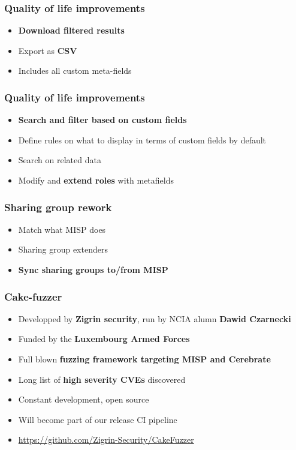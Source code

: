 \begin{frame}
\frametitle{Quality of life improvements}
    \begin{itemize}
        \item {\bf Download filtered results}
        \item Export as {\bf CSV}
        \item Includes all custom meta-fields
    \end{itemize}
\end{frame}

\begin{frame}
\frametitle{Quality of life improvements}
    \begin{itemize}
        \item {\bf Search and filter based on custom fields}
        \item Define rules on what to display in terms of custom fields by default
        \item Search on related data
        \item Modify and {\bf extend roles} with metafields
    \end{itemize}
\end{frame}

\begin{frame}
\frametitle{Sharing group rework}
    \begin{itemize}
        \item Match what MISP does
        \item Sharing group extenders
        \item {\bf Sync sharing groups to/from MISP}
    \end{itemize}
\end{frame}

\begin{frame}
\frametitle{Cake-fuzzer}
    \begin{itemize}
        \item Developped by {\bf Zigrin security}, run by NCIA alumn {\bf Dawid Czarnecki}
        \item Funded by the {\bf Luxembourg Armed Forces}
        \item Full blown {\bf fuzzing framework targeting MISP and Cerebrate}
        \item Long list of {\bf high severity CVEs} discovered
        \item Constant development, open source
        \item Will become part of our release CI pipeline
        \item \url{https://github.com/Zigrin-Security/CakeFuzzer}
    \end{itemize}
\end{frame}



